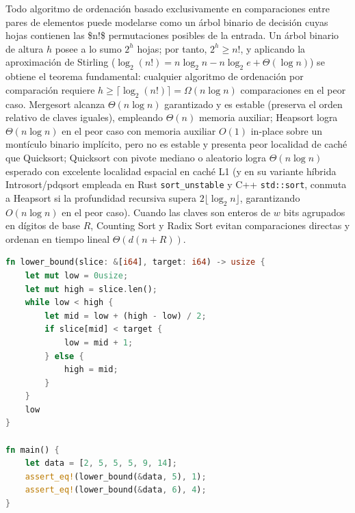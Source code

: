 \documentclass{book}
\begin{document}
Todo algoritmo de ordenación basado exclusivamente en comparaciones entre pares de elementos puede modelarse como un árbol binario de decisión cuyas hojas contienen las \$n!\$ permutaciones posibles de la entrada. Un árbol binario de altura \(h\) posee a lo sumo \(2^h\) hojas; por tanto, \(2^h \ge n!\), y aplicando la aproximación de Stirling (\(\log_2(n!) = n \log_2 n - n \log_2 e + \Theta(\log n)\)) se obtiene el teorema fundamental: cualquier algoritmo de ordenación por comparación requiere \(h \ge \lceil \log_2(n!) \rceil = \Omega(n \log n)\) comparaciones en el peor caso.
Mergesort alcanza \(\Theta(n \log n)\) garantizado y es estable (preserva el orden relativo de claves iguales), empleando \(\Theta(n)\) memoria auxiliar; Heapsort logra \(\Theta(n \log n)\) en el peor caso con memoria auxiliar \(O(1)\) in-place sobre un montículo binario implícito, pero no es estable y presenta peor localidad de caché que Quicksort; Quicksort con pivote mediano o aleatorio logra \(\Theta(n \log n)\) esperado con excelente localidad espacial en caché L1 (y en su variante híbrida Introsort/pdqsort empleada en Rust \texttt{sort\_unstable} y C++ \texttt{std::sort}, conmuta a Heapsort si la profundidad recursiva supera \(2 \lfloor \log_2 n \rfloor\), garantizando \(O(n \log n)\) en el peor caso). Cuando las claves son enteros de \(w\) bits agrupados en dígitos de base \(R\), Counting Sort y Radix Sort evitan comparaciones directas y ordenan en tiempo lineal \(\Theta(d(n + R))\).
\begin{lstlisting}[style=studium,language={Rust}]
fn lower_bound(slice: &[i64], target: i64) -> usize {
    let mut low = 0usize;
    let mut high = slice.len();
    while low < high {
        let mid = low + (high - low) / 2;
        if slice[mid] < target {
            low = mid + 1;
        } else {
            high = mid;
        }
    }
    low
}

fn main() {
    let data = [2, 5, 5, 5, 9, 14];
    assert_eq!(lower_bound(&data, 5), 1);
    assert_eq!(lower_bound(&data, 6), 4);
}
\end{lstlisting}
\end{document}
